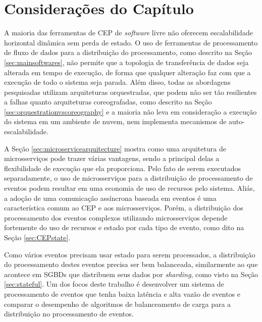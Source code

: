 \section{Considerações do Capítulo}
\label{sec:conclusions}

A maioria das ferramentas de CEP de \textit{software} livre não oferecem escalabilidade horizontal dinâmica sem perda de estado. O uso de ferramentas de processamento de fluxo de dados para a distribuição do processamento, como descrito na Seção \ref{sec:mainsoftwares}, não permite que a topologia de transferência de dados seja alterada em tempo de execução, de forma que qualquer alteração faz com que a execução de todo o sistema seja parada. Além disso, todas as abordagens pesquisadas utilizam arquiteturas orquestradas, que podem não ser tão resilientes a falhas quanto arquiteturas coreografadas, como descrito na Seção \ref{sec:orquestrationvscoreography} e a maioria não leva em consideração a execução do sistema em um ambiente de nuvem, nem implementa mecanismos de auto-escalabilidade.

A Seção \ref{sec:microservicearquitecture} mostra como uma arquitetura de microsserviços pode trazer várias vantagens, sendo a principal delas a flexibilidade de execução que ela proporciona. Pelo fato de serem executados separadamente, o uso de microsserviços para a distribuição de processamento de eventos podem resultar em uma economia de uso de recursos pelo sistema. Aliás, a adoção de uma comunicação assíncrona baseada em eventos é uma característica comum ao CEP e aos microsserviços. Porém, a distribuição dos processamento dos eventos complexos utilizando microsserviços depende fortemente do uso de recursos e estado por cada tipo de evento, como dito na Seção \ref{sec:CEPstate}.

Como vários eventos precisam usar estado para serem processados, a distribuição do processamento destes eventos precisa ser bem balanceada, similarmente ao que acontece em SGBDs que distribuem seus dados por \textit{sharding}, como visto na Seção \ref{sec:stateful}. Um dos focos deste trabalho é desenvolver um sistema de processamento de eventos que tenha baixa latência e alta vazão de eventos e comparar o desempenho de algoritmos de balanceamento de carga para a distribuição no processamento de eventos. 

